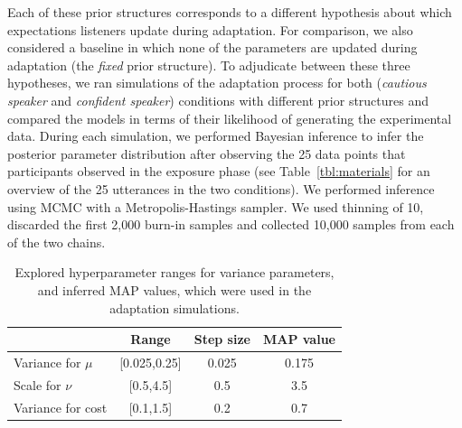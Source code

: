 \documentclass[man, floatsintext]{apa6}
\begin{document}
Each of these prior structures corresponds to a different hypothesis about which expectations listeners update during adaptation. For comparison, we also considered a baseline in which none of the parameters are updated during adaptation (the {\it fixed} prior structure). To adjudicate between these three hypotheses, we ran simulations of the adaptation process for both (\textit{cautious speaker} and \textit{confident speaker}) conditions with different prior structures and compared the models in terms of their likelihood of generating the experimental data. During each simulation, we performed Bayesian inference to infer the posterior parameter distribution after observing the 25 data points that participants observed in the exposure phase (see Table~\ref{tbl:materials} for an overview of the 25 utterances in the two conditions). We performed inference using MCMC with a Metropolis-Hastings sampler. We used thinning of 10, discarded the first 2,000 burn-in samples and collected 10,000 samples from each of the two chains.

\begin{table}
\center
\begin{tabular}{l | c | c | c  }
 & Range &  Step size & MAP value  \\ \midrule
Variance for $\mu$ & [0.025,0.25] & 0.025 & 0.175  \\
Scale for $\nu$  & [0.5,4.5]  & 0.5   & 3.5  \\
Variance for cost & [0.1,1.5] & 0.2 & 0.7  \\
\end{tabular}
\caption{Explored hyperparameter ranges for variance parameters, and inferred MAP values, which were used in the adaptation simulations.  \label{tbl:hyperparams}}
\end{table}
\end{document}
